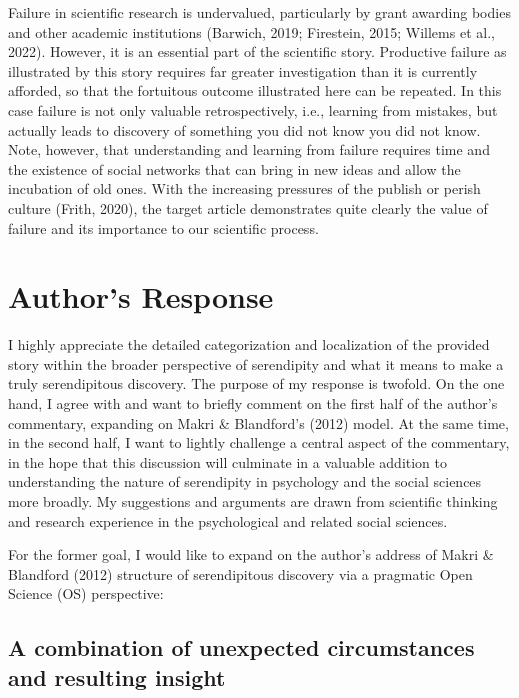 \documentclass[authordate, commentary]{jote-new-article}
\begin{document}
	
	Failure in scientific research is undervalued, particularly by grant awarding bodies and other academic institutions (Barwich, 2019; Firestein, 2015; Willems et al., 2022). However, it is an essential part of the scientific story. Productive failure as illustrated by this story requires far greater investigation than it is currently afforded, so that the fortuitous outcome illustrated here can be repeated. In this case failure is not only valuable retrospectively, i.e., learning from mistakes, but actually leads to discovery of something you did not know you did not know.  Note, however, that understanding and learning from failure requires time and the existence of social networks that can bring in new ideas and allow the incubation of old ones. With the increasing pressures of the publish or perish culture (Frith, 2020), the target article demonstrates quite clearly the value of failure and its importance to our scientific process.



	\section{Author's Response}



	I highly appreciate the detailed categorization and localization of the provided story within the broader perspective of serendipity and what it means to make a truly serendipitous discovery. The purpose of my response is twofold. On the one hand, I agree with and want to briefly comment on the first half of the author's commentary, expanding on Makri \& Blandford's (2012) model. At the same time, in the second half, I want to lightly challenge a central aspect of the commentary, in the hope that this discussion will culminate in a valuable addition to understanding the nature of serendipity in psychology and the social sciences more broadly. My suggestions and arguments are drawn from scientific thinking and research experience in the psychological and related social sciences.



	For the former goal, I would like to expand on the author's address of Makri \& Blandford (2012) structure of serendipitous discovery via a pragmatic Open Science (OS) perspective:



	\subsection{A combination of unexpected circumstances and resulting insight}
\end{document}
